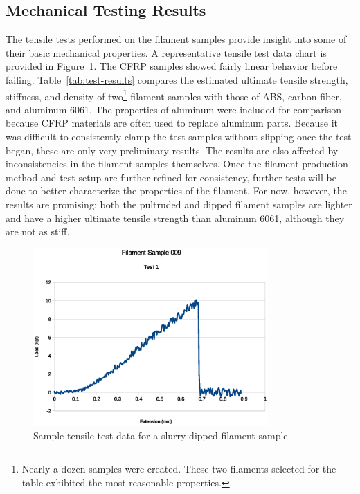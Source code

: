 \subsection{Mechanical Testing Results}

\indent

The tensile tests performed on the filament samples provide insight into some of their basic mechanical properties. A representative tensile test data chart is provided in Figure~\ref{fig:instron-sample}. The CFRP samples showed fairly linear behavior before failing. Table~\ref{tab:test-results} compares the estimated ultimate tensile strength, stiffness, and density of two\footnote{Nearly a dozen samples were created. These two filaments selected for the table exhibited the most reasonable properties.} filament samples with those of ABS, carbon fiber, and aluminum 6061. The properties of aluminum were included for comparison because CFRP materials are often used to replace aluminum parts. Because it was difficult to consistently clamp the test samples without slipping once the test began, these are only very preliminary results. The results are also affected by inconsistencies in the filament samples themselves. Once the filament production method and test setup are further refined for consistency, further tests will be done to better characterize the properties of the filament. For now, however, the results are promising: both the pultruded and dipped filament samples are lighter and have a higher ultimate tensile strength than aluminum 6061, although they are not as stiff.\\

\begin{figure}[htp]
    \centering
    \includegraphics[width=0.8\textwidth]{./figures/009T1-instron-data}
    \caption{Sample tensile test data for a slurry-dipped filament sample.}
    \label{fig:instron-sample}
\end{figure}

